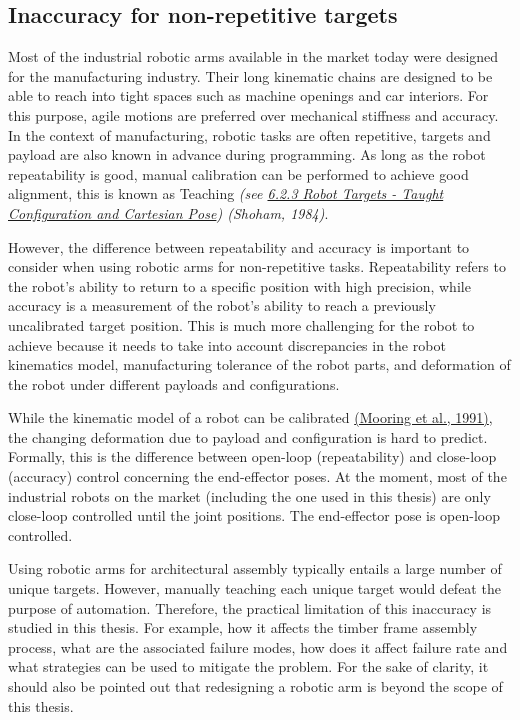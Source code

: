 \documentclass[11pt]{book}
\begin{document}
\subsection{Inaccuracy for non-repetitive targets}

Most of the industrial robotic arms available in the market today were designed for the manufacturing industry. Their long kinematic chains are designed to be able to reach into tight spaces such as machine openings and car interiors. For this purpose, agile motions are preferred over mechanical stiffness and accuracy. In the context of manufacturing, robotic tasks are often repetitive, targets and payload are also known in advance during programming. As long as the robot repeatability is good, manual calibration can be performed to achieve good alignment, this is known as Teaching \textit{(see \underline{6.2.3 Robot Targets - Taught Configuration and Cartesian Pose}) \href{https://www.zotero.org/google-docs/?A4enMq}{}(Shoham, 1984)}.

However, the difference between repeatability and accuracy is important to consider when using robotic arms for non-repetitive tasks. Repeatability refers to the robot's ability to return to a specific position with high precision, while accuracy is a measurement of the robot's ability to reach a previously uncalibrated target position. This is much more challenging for the robot to achieve because it needs to take into account discrepancies in the robot kinematics model, manufacturing tolerance of the robot parts, and deformation of the robot under different payloads and configurations. 

While the kinematic model of a robot can be calibrated \href{https://www.zotero.org/google-docs/?nvFaK9}{(Mooring et al., 1991)}, the changing deformation due to payload and configuration is hard to predict. Formally, this is the difference between open-loop (repeatability) and close-loop (accuracy) control concerning the end-effector poses. At the moment, most of the industrial robots on the market (including the one used in this thesis) are only close-loop controlled until the joint positions. The end-effector pose is open-loop controlled.  

Using robotic arms for architectural assembly typically entails a large number of unique targets. However, manually teaching each unique target would defeat the purpose of automation. Therefore, the practical limitation of this inaccuracy is studied in this thesis. For example, how it affects the timber frame assembly process, what are the associated failure modes, how does it affect failure rate and what strategies can be used to mitigate the problem. For the sake of clarity, it should also be pointed out that redesigning a robotic arm is beyond the scope of this thesis.
\end{document}
